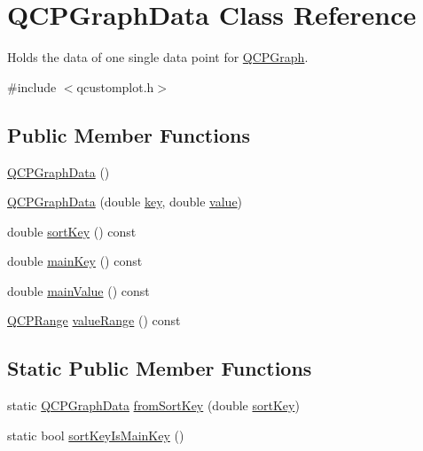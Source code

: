\hypertarget{class_q_c_p_graph_data}{}\section{Q\+C\+P\+Graph\+Data Class Reference}
\label{class_q_c_p_graph_data}


Holds the data of one single data point for \mbox{\hyperlink{class_q_c_p_graph}{Q\+C\+P\+Graph}}.  




{\ttfamily \#include $<$qcustomplot.\+h$>$}

\subsection*{Public Member Functions}
\begin{DoxyCompactItemize}
\item 
\mbox{\hyperlink{class_q_c_p_graph_data_ac43f7499383d2fa2ffb7a4ad43f76c7c}{Q\+C\+P\+Graph\+Data}} ()
\item 
\mbox{\hyperlink{class_q_c_p_graph_data_a2c32177f12f902f4e05f712837082bd6}{Q\+C\+P\+Graph\+Data}} (double \mbox{\hyperlink{class_q_c_p_graph_data_a2fcebdf84af975761c0661237d7e28ec}{key}}, double \mbox{\hyperlink{diffusion_8cpp_a4b41795815d9f3d03abfc739e666d5da}{value}})
\item 
double \mbox{\hyperlink{class_q_c_p_graph_data_a5e0f37ea101eeec245d8c32a2206b204}{sort\+Key}} () const
\item 
double \mbox{\hyperlink{class_q_c_p_graph_data_a72fdaf738f679ef93bea3d552ba42d1b}{main\+Key}} () const
\item 
double \mbox{\hyperlink{class_q_c_p_graph_data_a1b1e440a430a4a83d9a3f6f247510f27}{main\+Value}} () const
\item 
\mbox{\hyperlink{class_q_c_p_range}{Q\+C\+P\+Range}} \mbox{\hyperlink{class_q_c_p_graph_data_a2f8dd30360356f66cc418a170a9f3792}{value\+Range}} () const
\end{DoxyCompactItemize}
\subsection*{Static Public Member Functions}
\begin{DoxyCompactItemize}
\item 
static \mbox{\hyperlink{class_q_c_p_graph_data}{Q\+C\+P\+Graph\+Data}} \mbox{\hyperlink{class_q_c_p_graph_data_a4646eac7f7a48970ea0fc5153aab0e77}{from\+Sort\+Key}} (double \mbox{\hyperlink{class_q_c_p_graph_data_a5e0f37ea101eeec245d8c32a2206b204}{sort\+Key}})
\item 
static bool \mbox{\hyperlink{class_q_c_p_graph_data_a1c98dfd21b82321a173db4ff860dfd21}{sort\+Key\+Is\+Main\+Key}} ()
\end{DoxyCompactItemize}

